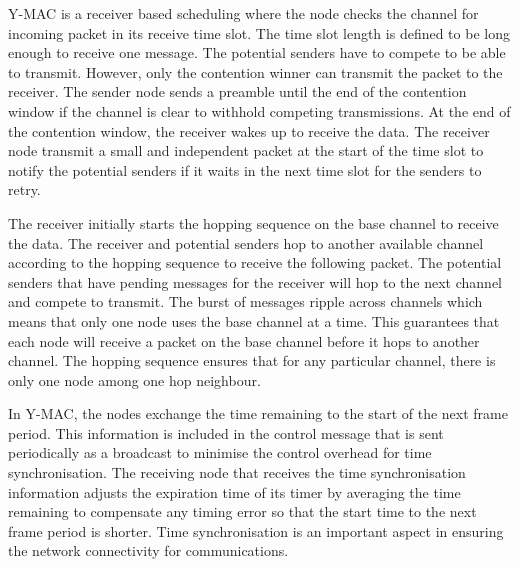 Y-MAC is a receiver based scheduling where the node checks the channel for incoming packet in its receive time slot. The time slot length is defined to be long enough to receive one message. The potential senders have to compete to be able to transmit. However, only the contention winner can transmit the packet to the receiver. The sender node sends a preamble until the end of the contention window if the channel is clear to withhold competing transmissions. At the end of the contention window, the receiver wakes up to receive the data. The receiver node transmit a small and independent packet at the start of the time slot to notify the potential senders if it waits in the next time slot for the senders to retry.

The receiver initially starts the hopping sequence on the base channel to receive the data. The receiver and potential senders hop to another available channel according to the hopping sequence to receive the following packet. The potential senders that have pending messages for the receiver will hop to the next channel and compete to transmit. The burst of messages ripple across channels which means that only one node uses the base channel at a time. This guarantees that each node will receive a packet on the base channel before it hops to another channel. The hopping sequence ensures that for any particular channel, there is only one node among one hop neighbour.

In Y-MAC, the nodes exchange the time remaining to the start of the next frame period. This information is included in the control message that is sent periodically as a broadcast to minimise the control overhead for time synchronisation. The receiving node that receives the time synchronisation information adjusts the expiration time of its timer by averaging the time remaining to compensate any timing error so that the start time to the next frame period is shorter. Time synchronisation is an important aspect in ensuring the network connectivity for communications.

 

